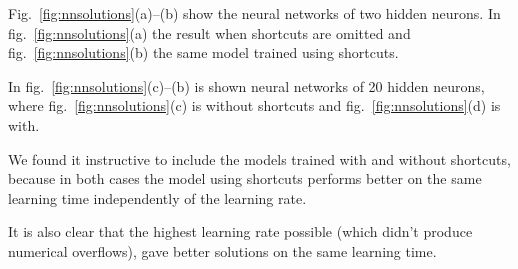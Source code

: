 \documentclass{article}
\begin{document}
Fig.~\ref{fig:nnsolutions}(a)--(b) show the neural networks of
two hidden neurons. In fig.~\ref{fig:nnsolutions}(a) the result when
shortcuts are omitted and fig.~\ref{fig:nnsolutions}(b) the same model
trained using shortcuts.

In fig.~\ref{fig:nnsolutions}(c)--(b) is shown neural networks of 20
hidden neurons, where fig.~\ref{fig:nnsolutions}(c) is without
shortcuts and fig.~\ref{fig:nnsolutions}(d) is with.

We found it instructive to include the models trained with and without
shortcuts, because in both cases the model using shortcuts performs
better on the same learning time independently of the learning rate.

It is also clear that the highest learning rate possible (which didn't
produce numerical overflows), gave better solutions on the same
learning time.
\end{document}
